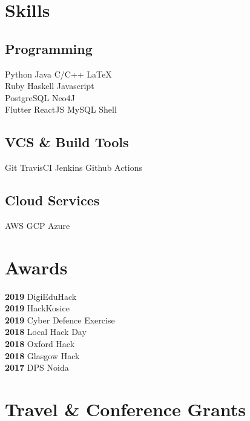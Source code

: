 \documentclass[]{deedy-resume-openfont}
\begin{document}
\begin{minipage}[t]{0.33\textwidth}


	\section{Skills}
	\subsection{Programming}
	Python \textbullet{} Java \textbullet{} C/C++ \textbullet{} \LaTeX\ \\
	Ruby \textbullet{} Haskell \textbullet{} Javascript \\
	PostgreSQL \textbullet{} Neo4J \\
	Flutter \textbullet{}
	ReactJS \textbullet{ }MySQL \textbullet{} Shell
	\subsection{VCS \& Build Tools}
	Git \textbullet{} TravisCI \textbullet{}Jenkins \textbullet{} Github Actions
	\subsection{Cloud Services}
	AWS \textbullet{} GCP \textbullet{} Azure
	\sectionsep


	\section{Awards}

	\textbf{2019 } DigiEduHack \\
	\textbf{2019 } HackKosice \\
	\textbf{2019 } Cyber Defence Exercise\\
	\textbf{2018 } Local Hack Day\\
	\textbf{2018 } Oxford Hack \\
	\textbf{2018 } Glasgow Hack \\
	\textbf{2017 } DPS Noida

	\section{Travel \& Conference Grants}


\end{minipage}
\end{document}
